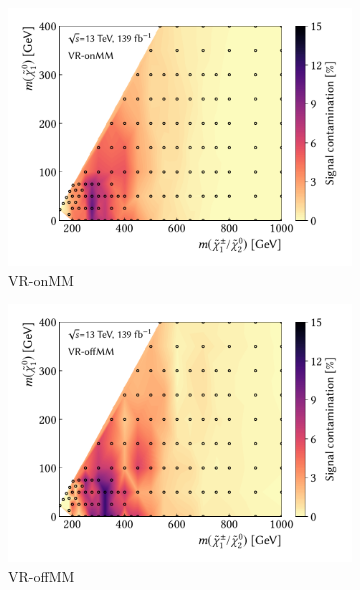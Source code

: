 \begin{figure}
\begin{subfigure}[b]{0.5\linewidth}
		\centering\includegraphics[width=1.0\textwidth]{signal_contamination/plot_VR_onMM}
		\caption{VR-onMM\label{fig:signal_contamination_VRon2}}
	\end{subfigure}\hfill
	\begin{subfigure}[b]{0.5\linewidth}
		\centering\includegraphics[width=1.0\textwidth]{signal_contamination/plot_VR_offMM}
		\caption{VR-offMM\label{fig:signal_contamination_VRoff2}}
	\end{subfigure}\hfill
	\begin{subfigure}[b]{0.5\linewidth}

\end{subfigure}
\end{figure}
